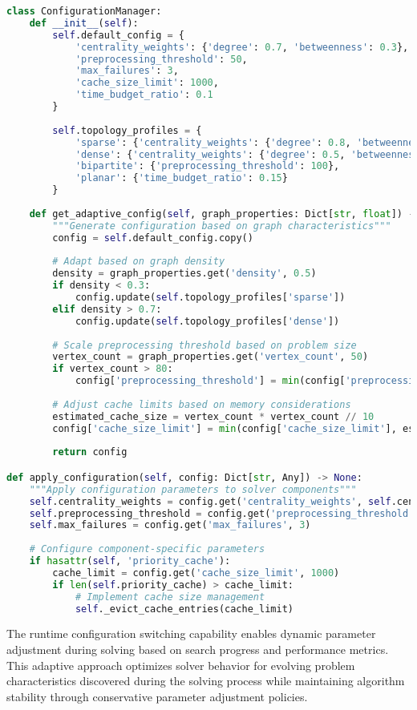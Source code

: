 \begin{lstlisting}[language=Python, caption=Adaptive Configuration Management]
class ConfigurationManager:
    def __init__(self):
        self.default_config = {
            'centrality_weights': {'degree': 0.7, 'betweenness': 0.3},
            'preprocessing_threshold': 50,
            'max_failures': 3,
            'cache_size_limit': 1000,
            'time_budget_ratio': 0.1
        }
        
        self.topology_profiles = {
            'sparse': {'centrality_weights': {'degree': 0.8, 'betweenness': 0.2}},
            'dense': {'centrality_weights': {'degree': 0.5, 'betweenness': 0.5}},
            'bipartite': {'preprocessing_threshold': 100},
            'planar': {'time_budget_ratio': 0.15}
        }
    
    def get_adaptive_config(self, graph_properties: Dict[str, float]) -> Dict[str, Any]:
        """Generate configuration based on graph characteristics"""
        config = self.default_config.copy()
        
        # Adapt based on graph density
        density = graph_properties.get('density', 0.5)
        if density < 0.3:
            config.update(self.topology_profiles['sparse'])
        elif density > 0.7:
            config.update(self.topology_profiles['dense'])
        
        # Scale preprocessing threshold based on problem size
        vertex_count = graph_properties.get('vertex_count', 50)
        if vertex_count > 80:
            config['preprocessing_threshold'] = min(config['preprocessing_threshold'], vertex_count // 2)
        
        # Adjust cache limits based on memory considerations
        estimated_cache_size = vertex_count * vertex_count // 10
        config['cache_size_limit'] = min(config['cache_size_limit'], estimated_cache_size)
        
        return config

def apply_configuration(self, config: Dict[str, Any]) -> None:
    """Apply configuration parameters to solver components"""
    self.centrality_weights = config.get('centrality_weights', self.centrality_weights)
    self.preprocessing_threshold = config.get('preprocessing_threshold', self.preprocessing_threshold)
    self.max_failures = config.get('max_failures', 3)
    
    # Configure component-specific parameters
    if hasattr(self, 'priority_cache'):
        cache_limit = config.get('cache_size_limit', 1000)
        if len(self.priority_cache) > cache_limit:
            # Implement cache size management
            self._evict_cache_entries(cache_limit)
\end{lstlisting}

The runtime configuration switching capability enables dynamic parameter adjustment during solving based on search progress and performance metrics. This adaptive approach optimizes solver behavior for evolving problem characteristics discovered during the solving process while maintaining algorithm stability through conservative parameter adjustment policies.